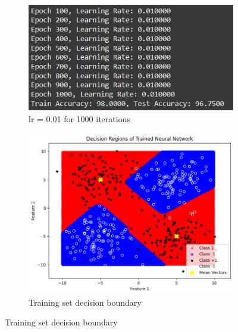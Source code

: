 \documentclass[a4paper,12pt]{article}
\begin{document}
\begin{figure}[H]
    \centering
    \captionsetup[subfigure]{list=true} %

    \begin{subfigure}{0.5\textwidth}
        \centering
        \includegraphics[width=\textwidth]{3.3_.01_1000_r.png}
        \caption{lr = 0.01 for 1000 iterations}
    \end{subfigure}
    \begin{subfigure}{0.45\textwidth}
        \centering
        \includegraphics[width=\textwidth]{3.3_.01_1000_Train.png}
        \caption{Training set decision boundary}
    \end{subfigure}


\end{figure}
\end{document}
